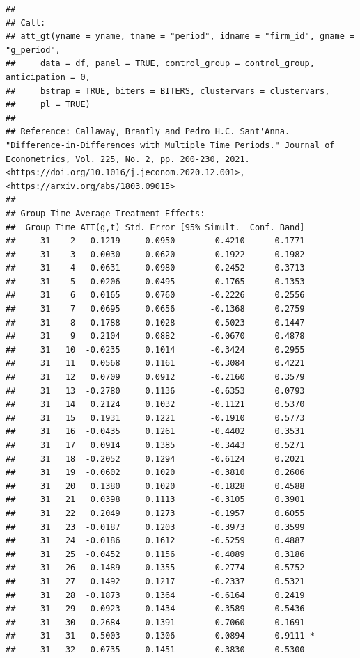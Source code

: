 \documentclass[
]{article}
\begin{document}
\begin{verbatim}
## 
## Call:
## att_gt(yname = yname, tname = "period", idname = "firm_id", gname = "g_period", 
##     data = df, panel = TRUE, control_group = control_group, anticipation = 0, 
##     bstrap = TRUE, biters = BITERS, clustervars = clustervars, 
##     pl = TRUE)
## 
## Reference: Callaway, Brantly and Pedro H.C. Sant'Anna.  "Difference-in-Differences with Multiple Time Periods." Journal of Econometrics, Vol. 225, No. 2, pp. 200-230, 2021. <https://doi.org/10.1016/j.jeconom.2020.12.001>, <https://arxiv.org/abs/1803.09015> 
## 
## Group-Time Average Treatment Effects:
##  Group Time ATT(g,t) Std. Error [95% Simult.  Conf. Band]  
##     31    2  -0.1219     0.0950       -0.4210      0.1771  
##     31    3   0.0030     0.0620       -0.1922      0.1982  
##     31    4   0.0631     0.0980       -0.2452      0.3713  
##     31    5  -0.0206     0.0495       -0.1765      0.1353  
##     31    6   0.0165     0.0760       -0.2226      0.2556  
##     31    7   0.0695     0.0656       -0.1368      0.2759  
##     31    8  -0.1788     0.1028       -0.5023      0.1447  
##     31    9   0.2104     0.0882       -0.0670      0.4878  
##     31   10  -0.0235     0.1014       -0.3424      0.2955  
##     31   11   0.0568     0.1161       -0.3084      0.4221  
##     31   12   0.0709     0.0912       -0.2160      0.3579  
##     31   13  -0.2780     0.1136       -0.6353      0.0793  
##     31   14   0.2124     0.1032       -0.1121      0.5370  
##     31   15   0.1931     0.1221       -0.1910      0.5773  
##     31   16  -0.0435     0.1261       -0.4402      0.3531  
##     31   17   0.0914     0.1385       -0.3443      0.5271  
##     31   18  -0.2052     0.1294       -0.6124      0.2021  
##     31   19  -0.0602     0.1020       -0.3810      0.2606  
##     31   20   0.1380     0.1020       -0.1828      0.4588  
##     31   21   0.0398     0.1113       -0.3105      0.3901  
##     31   22   0.2049     0.1273       -0.1957      0.6055  
##     31   23  -0.0187     0.1203       -0.3973      0.3599  
##     31   24  -0.0186     0.1612       -0.5259      0.4887  
##     31   25  -0.0452     0.1156       -0.4089      0.3186  
##     31   26   0.1489     0.1355       -0.2774      0.5752  
##     31   27   0.1492     0.1217       -0.2337      0.5321  
##     31   28  -0.1873     0.1364       -0.6164      0.2419  
##     31   29   0.0923     0.1434       -0.3589      0.5436  
##     31   30  -0.2684     0.1391       -0.7060      0.1691  
##     31   31   0.5003     0.1306        0.0894      0.9111 *
##     31   32   0.0735     0.1451       -0.3830      0.5300  

\end{verbatim}
\end{document}
